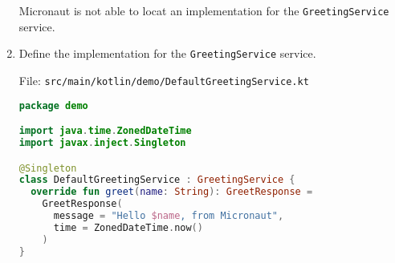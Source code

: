 \begin{enumerate}
Micronaut is not able to locat an implementation for the \texttt{GreetingService} service.

\item Define the implementation for the \texttt{GreetingService} service.

File: \texttt{src/main/kotlin/demo/DefaultGreetingService.kt}
\begin{lstlisting}[language=Kotlin]
package demo

import java.time.ZonedDateTime
import javax.inject.Singleton

@Singleton
class DefaultGreetingService : GreetingService {
  override fun greet(name: String): GreetResponse =
    GreetResponse(
      message = "Hello $name, from Micronaut",
      time = ZonedDateTime.now()
    )
}
\end{lstlisting}

\end{enumerate}


